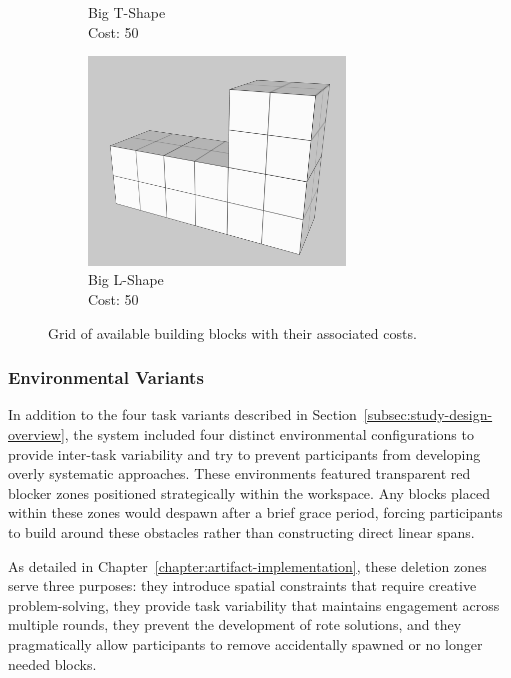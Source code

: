 \begin{figure}[htbp]
\begin{subfigure}[b]{0.28\textwidth}
        \caption{Big T-Shape\\Cost: 50}
        \label{fig:big-t-shape}
    \end{subfigure}
    
    \vspace{0.5cm}
    
    \begin{subfigure}[b]{0.28\textwidth}
        \centering
        \includegraphics[width=0.75\textwidth]{user-study-analysis/meta/shapes/big-l-shape.png}
        \caption{Big L-Shape\\Cost: 50}
        \label{fig:big-l-shape}
    \end{subfigure}
    
    \caption{Grid of available building blocks with their associated costs.}
    \label{fig:shapes-pricing-grid}
\end{figure}

\subsubsection{Environmental Variants}
In addition to the four task variants described in Section~\ref{subsec:study-design-overview}, the system included four distinct environmental configurations to provide inter-task variability and try to prevent participants from developing overly systematic approaches. These environments featured transparent red blocker zones positioned strategically within the workspace. Any blocks placed within these zones would despawn after a brief grace period, forcing participants to build around these obstacles rather than constructing direct linear spans.

As detailed in Chapter~\ref{chapter:artifact-implementation}, these deletion zones serve three purposes: they introduce spatial constraints that require creative problem-solving, they provide task variability that maintains engagement across multiple rounds, they prevent the development of rote solutions, and they pragmatically allow participants to remove accidentally spawned or no longer needed blocks.

